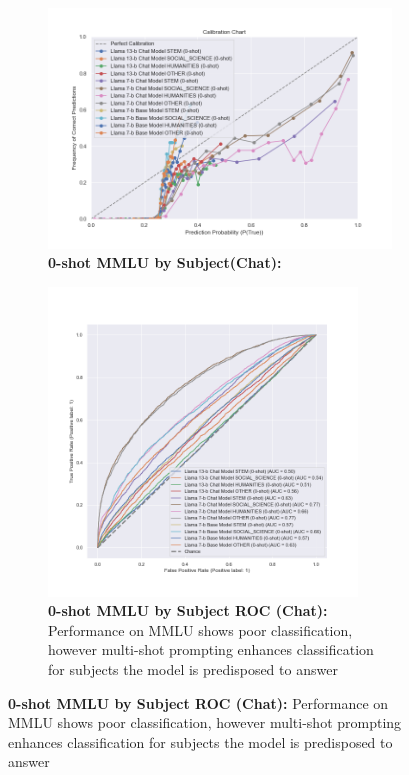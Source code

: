 \documentclass[11pt]{article}
\begin{document}
\begin{figure}
     \centering
     \begin{subfigure}[b]{0.60\textwidth}
         \centering \includegraphics[width=1.1\textwidth]{figures/0-shot-MMLU-subjects.png}
         \caption{\textbf{0-shot MMLU by Subject(Chat):} }
         \label{fig:0-shot-MMLU}
     \end{subfigure}
     \hfill
     \begin{subfigure}[b]{0.38\textwidth}
         \centering \includegraphics[width=0.9\textwidth]{figures/0-shot-MMLU-subjects-roc.png}
         \caption{\textbf{0-shot MMLU by Subject ROC (Chat):} Performance on MMLU shows poor classification, however multi-shot prompting enhances classification for subjects the model is predisposed to answer}
         \label{fig:0-shot-MMLU-ROC}
    \end{subfigure}
    

\end{figure}
\end{document}
